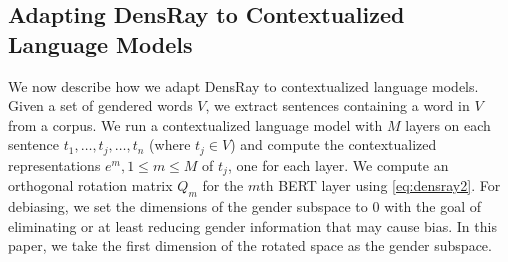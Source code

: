 \subsection{Adapting DensRay to Contextualized Language Models}
We now describe how we adapt DensRay to contextualized
language models. Given a set of gendered words
$V$, we extract sentences containing a word in $V$ from a
corpus. We run a contextualized language model
with $M$ layers
on each
sentence
$t_1,\ldots,t_j,\ldots,t_n$ (where $t_j \in V$)
and compute the contextualized representations $e^m, 1\leq m
\leq M$ of $t_j$, one for each layer. 
We compute an orthogonal rotation
matrix $Q_m$ for the $m$th BERT layer using \eqref{eq:densray2}.
For debiasing, we set the dimensions
of the gender subspace to $0$ with the goal of eliminating or at least reducing gender
information that may cause bias. In this paper, we take the first dimension of the rotated space as the gender subspace.

